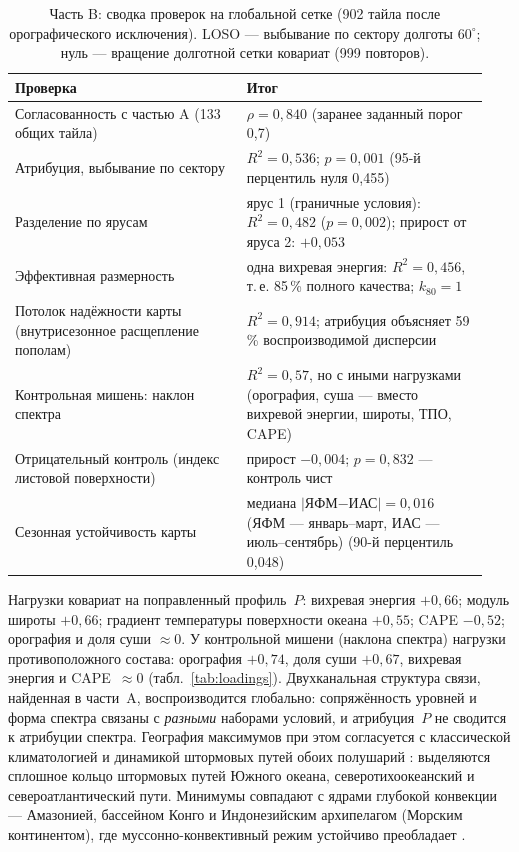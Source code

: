 \documentclass[11pt,a4paper]{article}
\begin{document}
\begin{table}[t]
\centering
\caption{Часть B: сводка проверок на глобальной сетке (902 тайла после орографического исключения). LOSO --- выбывание по сектору долготы $60^\circ$; нуль --- вращение долготной сетки ковариат (999 повторов).}
\label{tab:armB}
\small
\begin{tabular}{@{}p{0.46\linewidth}p{0.48\linewidth}@{}}
\toprule
Проверка & Итог\\
\midrule
Согласованность с частью A (133 общих тайла) & $\rho=0{,}840$ (заранее заданный порог 0,7)\\
Атрибуция, выбывание по сектору & $R^2=0{,}536$; $p=0{,}001$ (95-й перцентиль нуля 0,455)\\
Разделение по ярусам & ярус 1 (граничные условия): $R^2=0{,}482$ ($p=0{,}002$); прирост от яруса 2: $+0{,}053$\\
Эффективная размерность & одна вихревая энергия: $R^2=0{,}456$, т.\,е. 85\,\% полного качества; $k_{80}=1$\\
Потолок надёжности карты (внутрисезонное расщепление пополам) & $R^2=0{,}914$; атрибуция объясняет 59\,\% воспроизводимой дисперсии\\
Контрольная мишень: наклон спектра & $R^2=0{,}57$, но с иными нагрузками (орография, суша --- вместо вихревой энергии, широты, ТПО, CAPE)\\
Отрицательный контроль (индекс листовой поверхности) & прирост $-0{,}004$; $p=0{,}832$ --- контроль чист\\
Сезонная устойчивость карты & медиана $\lvert$ЯФМ$-$ИАС$\rvert=0{,}016$ (ЯФМ --- январь--март, ИАС --- июль--сентябрь) (90-й перцентиль 0,048)\\
\bottomrule
\end{tabular}
\end{table}

Нагрузки ковариат на поправленный профиль~$P$: вихревая энергия $+0{,}66$; модуль широты $+0{,}66$; градиент температуры поверхности океана $+0{,}55$; CAPE $-0{,}52$; орография и доля суши $\approx0$. У контрольной мишени (наклона спектра) нагрузки противоположного состава: орография $+0{,}74$, доля суши $+0{,}67$, вихревая энергия и CAPE~$\approx0$ (табл.~\ref{tab:loadings}). Двухканальная структура связи, найденная в части~A, воспроизводится глобально: сопряжённость уровней и форма спектра связаны с \emph{разными} наборами условий, и атрибуция~$P$ не сводится к атрибуции спектра. География максимумов при этом согласуется с классической климатологией и динамикой штормовых путей обоих полушарий \cite{HoskinsValdes1990,Chang2002,HoskinsHodges2005,Shaw2016}: выделяются сплошное кольцо штормовых путей Южного океана, северотихоокеанский и североатлантический пути. Минимумы совпадают с ядрами глубокой конвекции --- Амазонией, бассейном Конго и Индонезийским архипелагом (Морским континентом), где муссонно-конвективный режим устойчиво преобладает \cite{NealeSlingo2003}.
\end{document}
